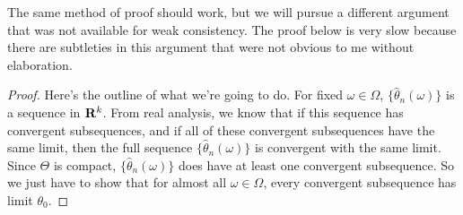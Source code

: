 \documentclass[11pt,letterpaper,reqno,oneside]{article}
\begin{document}
The same method of proof should work, but we will pursue a different argument that was not available for weak consistency. The proof below is very slow because there are subtleties in this argument that were not obvious to me without elaboration.
%
\begin{proof}
	Here's the outline of what we're going to do. For fixed $\omega \in \Omega$, $\bigl\{ \widehat{\theta}_n(\omega) \bigr\}$ is a sequence in $\mathbf{R}^k$. From real analysis, we know that if this sequence has convergent subsequences, and if all of these convergent subsequences have the same limit, then the full sequence $\bigl\{ \widehat{\theta}_n(\omega) \bigr\}$ is convergent with the same limit. Since $\Theta$ is compact, $\bigl\{ \widehat{\theta}_n(\omega) \bigr\}$ does have at least one convergent subsequence. So we just have to show that for almost all $\omega \in \Omega$, every convergent subsequence has limit $\theta_0$.


\end{proof}
\end{document}
